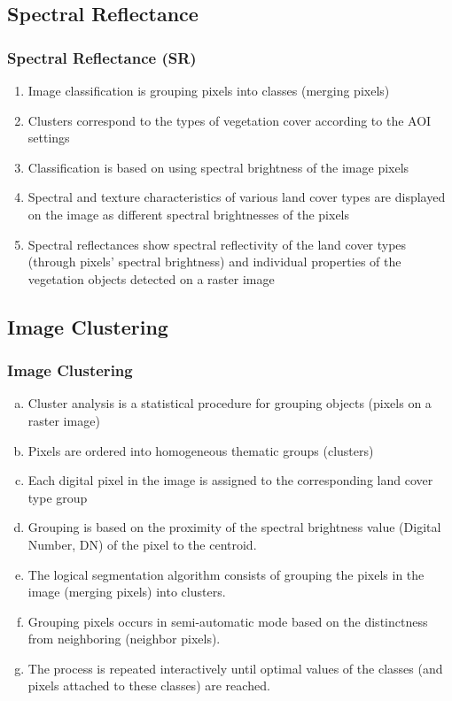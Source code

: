 \documentclass[pdflatex,compress,9pt,
	xcolor={dvipsnames,dvipsnames,svgnames,x11names,table},
	hyperref={colorlinks = true,breaklinks = true, urlcolor = NavyBlue, breaklinks = true}]{beamer}
\begin{document}
\subsection{Spectral Reflectance}
\begin{frame}\frametitle{Spectral Reflectance (SR)}
\begin{enumerate}[SR i.]
	\item Image classification is grouping pixels into classes (merging pixels)
	\item Clusters correspond to the types of vegetation cover according to the AOI settings
	\item Classification is based on using spectral brightness of the image pixels
	\item Spectral and texture characteristics of various land cover types are displayed on the image as different spectral brightnesses of the pixels
	\item Spectral reflectances show spectral reflectivity of the land cover types (through pixels' spectral brightness) and individual properties of the vegetation objects detected on a raster image 
\end{enumerate}
\end{frame}

\subsection{Image Clustering}
\begin{frame}\frametitle{Image Clustering}
\begin{enumerate}[(a)]
            \item Cluster analysis is a statistical procedure for grouping objects (pixels on a raster image)
            \item Pixels are ordered into homogeneous thematic groups (clusters)
            \item Each digital pixel in the image is assigned to the corresponding land cover type group
            \item Grouping is based on the proximity of the spectral brightness value (Digital Number, DN) of the pixel to the centroid.
            \item The logical segmentation algorithm consists of grouping the pixels in the image (merging pixels) into clusters. 
            \item Grouping pixels occurs in semi-automatic mode based on the distinctness from neighboring (neighbor pixels).
            \item The process is repeated interactively until optimal values of the classes (and pixels attached to these classes) are reached.
\end{enumerate}
\end{frame}
\end{document}
